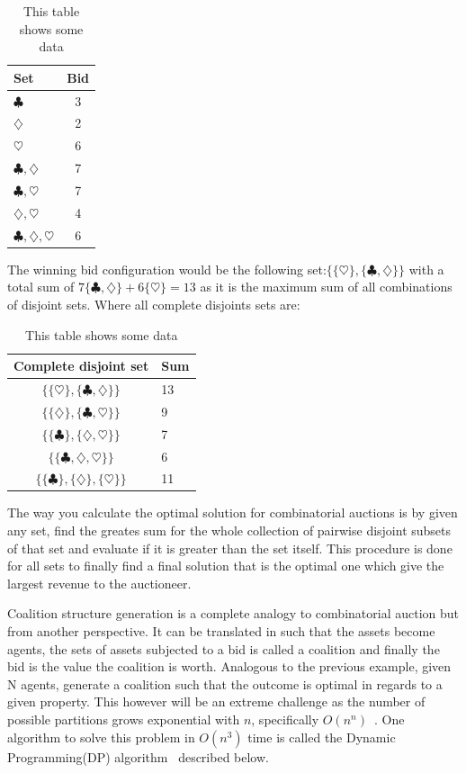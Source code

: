 \documentclass[a4paper, 12pt]{report}
\begin{document}
\begin{table}[htb]
\centering
\begin{tabular}{ l | c}
\hline  
Set & Bid \\
\hline
$\clubsuit$ & 3 \\
$\diamondsuit$ & 2 \\
$\heartsuit$ & 6 \\
$\clubsuit, \diamondsuit$ & 7 \\
$\clubsuit, \heartsuit$ & 7 \\
$\diamondsuit, \heartsuit$ & 4 \\
$\clubsuit, \diamondsuit, \heartsuit$ & 6 \\
\end{tabular}
\caption{This table shows some data}
\label{tab:myfirsttable}
\end{table}

The winning bid configuration would be the following set:$ \{\{\heartsuit\},\{\clubsuit , \diamondsuit\}\}$ with a total sum of $7 \{\clubsuit , \diamondsuit\}+6 \{\heartsuit\} = 13$ as it is the maximum sum of all combinations of disjoint sets. Where all complete disjoints sets are:

\begin{table}[htb]
\centering
\begin{tabular}{c | l }
\hline
Complete disjoint set & Sum\\
\hline
$\{\{\heartsuit \},\{\clubsuit , \diamondsuit \}\} $ & 13 \\
$\{\{\diamondsuit \},\{\clubsuit , \heartsuit \}\} $ & 9 \\
$\{\{\clubsuit \},\{\diamondsuit , \heartsuit \}\} $ & 7 \\

$\{\{\clubsuit,\diamondsuit , \heartsuit \}\} $ & 6 \\
$\{\{\clubsuit \},\{\diamondsuit \}, \{ \heartsuit \}\} $ &  11
\end{tabular}
\caption{This table shows some data}
\label{tab:myfirsttable}
\end{table}

The way you calculate the optimal solution for combinatorial auctions is by given any set, find the greates sum for the whole collection of pairwise disjoint subsets of that set and evaluate if it is greater than the set itself. This procedure is done for all sets to finally find a final solution that is the optimal one which give the largest revenue to the auctioneer.

Coalition structure generation is a complete analogy to combinatorial auction but from another perspective. It can be translated in such that the assets become agents, the sets of assets subjected to a bid is called a coalition and finally the bid is the value the coalition is worth. Analogous to the previous example, given N agents, generate a coalition such that the outcome is optimal in regards to a given property. This however will be an extreme challenge as the number of possible partitions grows exponential with $n$, specifically $O(n^n)$~\cite{rahwan2008improved}. One algorithm to solve this problem in $O(n^3)$ time is called the Dynamic Programming(DP) algorithm~\citep{rothkopf1998computationally} described below.
\end{document}
